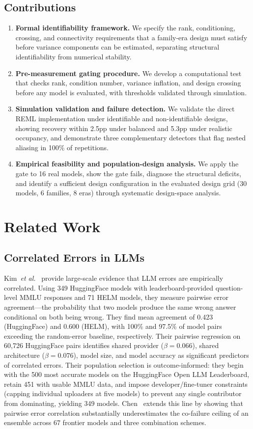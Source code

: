 \documentclass[11pt]{article}
\theoremstyle{definition}
\theoremstyle{plain}
\begin{document}
\subsection{Contributions}
\begin{enumerate}
\item \textbf{Formal identifiability framework.} We specify the rank, conditioning, crossing, and connectivity requirements that a family-era design must satisfy before variance components can be estimated, separating structural identifiability from numerical stability.
\item \textbf{Pre-measurement gating procedure.} We develop a computational test that checks rank, condition number, variance inflation, and design crossing before any model is evaluated, with thresholds validated through simulation.
\item \textbf{Simulation validation and failure detection.} We validate the direct REML implementation under identifiable and non-identifiable designs, showing recovery within 2.5pp under balanced and 5.3pp under realistic occupancy, and demonstrate three complementary detectors that flag nested aliasing in 100\% of repetitions.
\item \textbf{Empirical feasibility and population-design analysis.} We apply the gate to 16 real models, show the gate fails, diagnose the structural deficits, and identify a sufficient design configuration in the evaluated design grid (30 models, 6 families, 8 eras) through systematic design-space analysis.
\end{enumerate}

\section{Related Work}
\label{sec:related}

\subsection{Correlated Errors in LLMs}
Kim~\textit{et al.}~\cite{kim2025} provide large-scale evidence that LLM errors are empirically correlated. Using 349 HuggingFace models with leaderboard-provided question-level MMLU responses and 71 HELM models, they measure pairwise error agreement---the probability that two models produce the same wrong answer conditional on both being wrong. They find mean agreement of 0.423 (HuggingFace) and 0.600 (HELM), with 100\% and 97.5\% of model pairs exceeding the random-error baseline, respectively. Their pairwise regression on 60,726 HuggingFace pairs identifies shared provider ($\beta = 0.066$), shared architecture ($\beta = 0.076$), model size, and model accuracy as significant predictors of correlated errors. Their population selection is outcome-informed: they begin with the 500 most accurate models on the HuggingFace Open LLM Leaderboard, retain 451 with usable MMLU data, and impose developer/fine-tuner constraints (capping individual uploaders at five models) to prevent any single contributor from dominating, yielding 349 models. Chen~\cite{chen2026} extends this line by showing that pairwise error correlation substantially underestimates the co-failure ceiling of an ensemble across 67 frontier models and three combination schemes.
\end{document}
